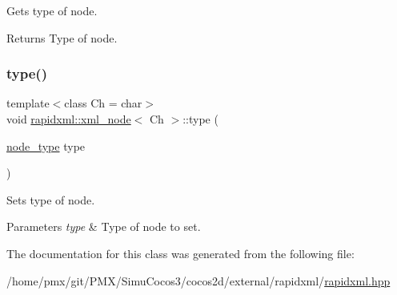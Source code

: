 Gets type of node. \begin{DoxyReturn}{Returns}
Type of node. 
\end{DoxyReturn}
\mbox{\label{classrapidxml_1_1xml__node_a499bbc9300c1b06821d5c08b24164c68}} 
\subsubsection{\texorpdfstring{type()}{type()}\hspace{0.1cm}{\footnotesize\ttfamily [2/2]}}
{\footnotesize\ttfamily template$<$class Ch = char$>$ \\
void \hyperlink{classrapidxml_1_1xml__node}{rapidxml\+::xml\+\_\+node}$<$ Ch $>$\+::type (\begin{DoxyParamCaption}\item[{\hyperlink{rapidxml_8hpp_abb456db38f7efb746c4330eed6072a7c}{node\+\_\+type}}]{type }\end{DoxyParamCaption})\hspace{0.3cm}{\ttfamily [inline]}}

Sets type of node. 
\begin{DoxyParams}{Parameters}
{\em type} & Type of node to set. \\
\hline
\end{DoxyParams}


The documentation for this class was generated from the following file\+:\begin{DoxyCompactItemize}
\item 
/home/pmx/git/\+P\+M\+X/\+Simu\+Cocos3/cocos2d/external/rapidxml/\hyperlink{rapidxml_8hpp}{rapidxml.\+hpp}\end{DoxyCompactItemize}
